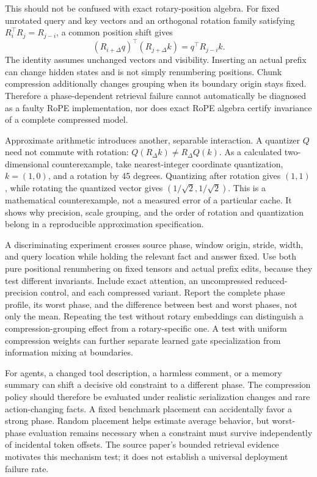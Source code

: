 This should not be confused with exact rotary-position algebra. For fixed unrotated query and key vectors and an orthogonal rotation family satisfying $R_i^\top R_j=R_{j-i}$, a common position shift gives
\begin{equation}
 (R_{i+\Delta}q)^\top(R_{j+\Delta}k)
 =q^\top R_{j-i}k.
\end{equation}
The identity assumes unchanged vectors and visibility. Inserting an actual prefix can change hidden states and is not simply renumbering positions. Chunk compression additionally changes grouping when its boundary origin stays fixed. Therefore a phase-dependent retrieval failure cannot automatically be diagnosed as a faulty RoPE implementation, nor does exact RoPE algebra certify invariance of a complete compressed model.

Approximate arithmetic introduces another, separable interaction. A quantizer $Q$ need not commute with rotation: $Q(R_\Delta k)\neq R_\Delta Q(k)$. As a calculated two-dimensional counterexample, take nearest-integer coordinate quantization, $k=(1,0)$, and a rotation by 45 degrees. Quantizing after rotation gives $(1,1)$, while rotating the quantized vector gives $(1/\sqrt2,1/\sqrt2)$. This is a mathematical counterexample, not a measured error of a particular cache. It shows why precision, scale grouping, and the order of rotation and quantization belong in a reproducible approximation specification.

A discriminating experiment crosses source phase, window origin, stride, width, and query location while holding the relevant fact and answer fixed. Use both pure positional renumbering on fixed tensors and actual prefix edits, because they test different invariants. Include exact attention, an uncompressed reduced-precision control, and each compressed variant. Report the complete phase profile, its worst phase, and the difference between best and worst phases, not only the mean. Repeating the test without rotary embeddings can distinguish a compression-grouping effect from a rotary-specific one. A test with uniform compression weights can further separate learned gate specialization from information mixing at boundaries.

For agents, a changed tool description, a harmless comment, or a memory summary can shift a decisive old constraint to a different phase. The compression policy should therefore be evaluated under realistic serialization changes and rare action-changing facts. A fixed benchmark placement can accidentally favor a strong phase. Random placement helps estimate average behavior, but worst-phase evaluation remains necessary when a constraint must survive independently of incidental token offsets. The source paper's bounded retrieval evidence motivates this mechanism test; it does not establish a universal deployment failure rate.

